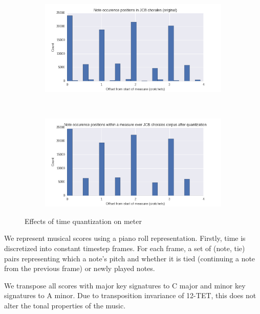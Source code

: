 \documentclass[dissertation.tex]{subfiles}
\begin{document}
\begin{figure}[htpb]
    \centering
    \begin{subfigure}[t]{0.48\textwidth}
        \centering
        \includegraphics[width=1.0\linewidth]{Figures/meter-usage-original.png}
    \end{subfigure}
    ~
    \begin{subfigure}[t]{0.48\textwidth}
        \centering
        \includegraphics[width=1.0\linewidth]{Figures/meter-usage-quantized.png}
    \end{subfigure}
    \caption{Effects of time quantization on meter}
    \label{fig:meter-time-quantization}
\end{figure}

We represent musical scores using a piano roll representation. Firstly, time is
discretized into constant timestep frames. For each frame, a set of (note, tie)
pairs representing which a note's pitch and whether it is tied
(continuing a note from the previous frame) or newly played notes.


We transpose all scores with major key signatures to C major and minor key
signatures to A minor. Due to transposition invariance of 12-TET, this does
not alter the tonal properties of the music.
\end{document}
